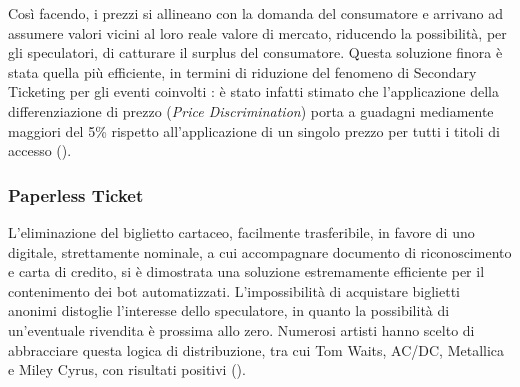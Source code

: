 Così facendo, i prezzi si allineano con la domanda del consumatore e arrivano ad assumere valori vicini al loro reale valore di mercato, riducendo la possibilità, per gli speculatori, di catturare il surplus del consumatore.
Questa soluzione finora è stata quella più efficiente, in termini di riduzione del fenomeno di Secondary Ticketing per gli eventi coinvolti \cite{loewenstein2010ticket}: è stato infatti stimato che l'applicazione della differenziazione di prezzo (\textit{Price Discrimination}) porta a guadagni mediamente maggiori del 5\% rispetto all'applicazione di un singolo prezzo per tutti i titoli di accesso (\cite{courty2012impact}). 

\subsubsection{Paperless Ticket}
L'eliminazione del biglietto cartaceo, facilmente trasferibile, in favore di uno digitale, strettamente nominale, a cui accompagnare documento di riconoscimento e carta di credito, si è dimostrata una soluzione estremamente efficiente per il contenimento dei bot automatizzati. L'impossibilità di acquistare biglietti anonimi distoglie l'interesse dello speculatore, in quanto la possibilità di un'eventuale rivendita è prossima allo zero.
Numerosi artisti hanno scelto di abbracciare questa logica di distribuzione, tra cui Tom Waits, AC/DC, Metallica e Miley Cyrus, con risultati positivi (\cite{drayer2011examining}).
